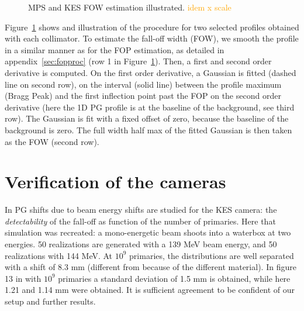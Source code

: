 \documentclass[a4paper,english,12pt]{article}
\newcommand{\ds}[2][orange]{\textcolor{#1}{#2}}
\begin{document}
\begin{figure}[htp]
  \centering
  \quad
  \caption{\label{FOWILLUS} MPS and KES FOW estimation illustrated. \ds{idem x scale}}
\end{figure}

Figure~\ref{FOWILLUS} shows and illustration of the procedure for two selected profiles obtained with each collimator. To estimate the fall-off width (FOW), we smooth the profile in a similar manner as for the FOP estimation, as detailed in appendix~\ref{sec:fopproc} (row 1 in Figure~\ref{FOWILLUS}). Then, a first and second order derivative is computed. On the first order derivative, a Gaussian is fitted (dashed line on second row), on the interval (solid line) between the profile maximum (Bragg Peak) and the first inflection point past the FOP on the second order derivative (here the 1D PG profile is at the baseline of the background, see third row). The Gaussian is fit with a fixed offset of zero, because the baseline of the background is zero. The full width half max of the fitted Gaussian is then taken as the FOW (second row).


\section{Verification of the cameras}

In \cite{Priegnitz2015} PG shifts due to beam energy shifts are studied for the KES camera: the \emph{detectability} of the fall-off as function of the number of primaries. Here that simulation was recreated: a mono-energetic beam shoots into a waterbox at two energies. 50 realizations are generated with a 139 MeV beam energy, and 50 realizations with 144 MeV. At $10^9$ primaries, the distributions are well separated with a shift of 8.3 mm (different from \cite{Priegnitz2015} because of the different material). In figure 13 in \cite{Perali2014} with $10^9$ primaries a standard deviation of 1.5 mm is obtained, while here 1.21 and 1.14 mm were obtained. It is sufficient agreement to be confident of our setup and further results.
\end{document}
